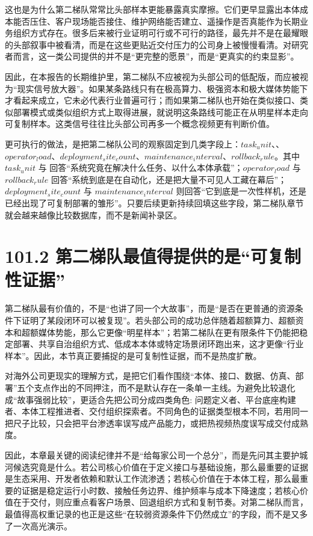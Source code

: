 这也是为什么第二梯队常常比头部样本更能暴露真实摩擦。它们更早显露出本体成本能否压住、客户现场能否接住、维护网络能否建立、遥操作是否真能作为长期业务组织方式存在。很多后来被行业证明可行或不可行的路径，最先并不是在最耀眼的头部叙事中被看清，而是在这些更贴近交付压力的公司身上被慢慢看清。对研究者而言，这一类公司提供的并不是“更完整的愿景”，而是“更真实的约束显影”。

因此，在本报告的长期维护里，第二梯队不应被视为头部公司的低配版，而应被视为“现实信号放大器”。如果某条路线只有在极高算力、极强资本和极大媒体势能下才看起来成立，它未必代表行业普遍可行；而如果第二梯队也开始在类似接口、类似部署模式或类似组织方式上取得进展，就说明这条路线可能正在从明星样本走向可复制样本。这类信号往往比头部公司再多一个概念视频更有判断价值。

更可执行的做法，是把第二梯队公司的观察固定到几类字段上：\(task_unit\)、\texttt{}、\(operator_load\)、\(deployment_site_count\)、\(maintenance_interval\)、\(rollback_rule\)。其中 \(task_unit\) 与 \texttt{} 回答“系统究竟在解决什么任务、以什么本体承载”；\(operator_load\) 与 \(rollback_rule\) 回答“系统到底是在自动化，还是把大量不可见人工藏在幕后”；\(deployment_site_count\) 与 \(maintenance_interval\) 则回答“它到底是一次性样机，还是已经出现了可复制部署的雏形”。只要后续更新持续回填这些字段，第二梯队章节就会越来越像比较数据库，而不是新闻补录区。

\section*{101.2 第二梯队最值得提供的是“可复制性证据”}


第二梯队最有价值的，不是“也讲了同一个大故事”，而是“是否在更普通的资源条件下证明了某段闭环可以被复现”。若头部公司的成功总伴随着超额算力、超额资本和超额媒体势能，那么它更像“明星样本”；若第二梯队在更有限条件下仍能把稳定部署、共享自治组织方式、低成本本体或特定场景闭环跑出来，这才更像“行业样本”。因此，本节真正要捕捉的是可复制性证据，而不是热度扩散。

对海外公司更现实的理解方式，是把它们看作围绕“本体、接口、数据、仿真、部署”五个支点作出的不同押注，而不是默认存在一条单一主线。为避免比较退化成“故事强弱比较”，更适合先把公司分成四类角色: 问题定义者、平台底座构建者、本体工程推进者、交付组织探索者。不同角色的证据类型根本不同，若用同一把尺子比较，只会把平台渗透率误写成产品能力，或把热视频热度误写成交付成熟度。

因此，本章最关键的阅读纪律并不是“给每家公司一个总分”，而是先问其主要护城河候选究竟是什么。若公司核心价值在于定义接口与基础设施，那么最重要的证据是生态采用、开发者依赖和默认工作流渗透；若核心价值在于本体工程，那么最重要的证据是稳定运行小时数、接触任务边界、维护频率与成本下降速度；若核心价值在于交付，则应重点看客户场景、回退组织方式和复制节奏。对第二梯队而言，最值得高权重记录的也正是这些“在较弱资源条件下仍然成立”的字段，而不是又多了一次高光演示。

